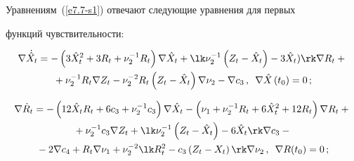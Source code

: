 



Уравнениям~(\ref{e7.7-s1}) отвечают следующие уравнения для первых 

функций чувствительности:

\begin{multline*}

\nabla \dot{\hat X}_t=- \left(3 \hat X_t^2 + 3 R_t + \nu_2^{-1} R_t\right) 

\nabla \hat X_t +\lk \nu_2^{-1} \left(Z_t -\hat X_t\right) - 3 \hat X_t)\rk 

\nabla R_t +{}\\

{}+ \nu_2^{-1} R_t\nabla Z_t - \nu_2^{-2} R_t 

\left(Z_t -\hat X_t\right) \nabla \nu_2 - \nabla c_3\,,\enskip 

\nabla \hat X\left(t_0\right)=0\,; %

\end{multline*}



\vspace*{-12pt}



\noindent

\begin{multline*}

\nabla \dot R_t =-\left(12\hat X_t R_t + 6 c_3 + \nu_2^{-1} c_3\right) 

\nabla \hat X_t - \left(\nu_1+\nu_2^{-1} R_t + 6 \hat X_t^2 + 12 R_t\right) 

\nabla R_t+{}\\

{}+\nu_2^{-1} c_3 \nabla Z_t +  \lk \nu_2^{-1} \left(Z_t -\hat X_t\right) - 

6 \hat X_t\rk \nabla c_3 -{}\\

{}-2 \nabla c_4+ R_t\nabla \nu_1+ \nu_2^{-2} \lk R_t^2 - 

c_3 \left(Z_t-X_t\right)\rk\nabla \nu_2\,,\enskip \nabla R(t_0)=0\,; %

\end{multline*}



\vspace*{-12pt}



